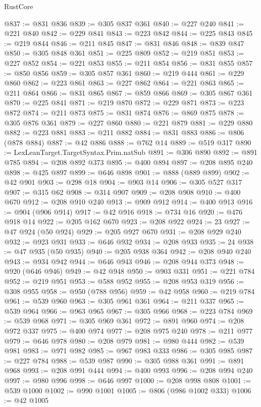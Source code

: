 \begin{lexlean}{RustCore}
\begin{coremodule}
@837 := @831 @836
@839 := @305 @837 @361
@840 := @227 @240
@841 := @221 @840
@842 := @229 @841
@843 := @223 @842
@844 := @225 @843
@845 := @219 @844
@846 := @211 @845
@847 := @831 @846
@848 := @839 @847
@850 := @305 @848 @361
@851 := @225 @809
@852 := @219 @851
@853 := @227 @852
@854 := @221 @853
@855 := @211 @854
@856 := @831 @855
@857 := @850 @856
@859 := @305 @857 @361
@860 := @219 @444
@861 := @229 @860
@862 := @223 @861
@863 := @227 @862
@864 := @221 @863
@865 := @211 @864
@866 := @831 @865
@867 := @859 @866
@869 := @305 @867 @361
@870 := @225 @841
@871 := @219 @870
@872 := @229 @871
@873 := @223 @872
@874 := @211 @873
@875 := @831 @874
@876 := @869 @875
@878 := @305 @876 @361
@879 := @227 @860
@880 := @221 @879
@881 := @229 @880
@882 := @223 @881
@883 := @211 @882
@884 := @831 @883
@886 := @806 (@878 @884)
@887 := @42 @886
@888 := @762 @14
@889 := @519 @317
@890 := LexLeanTarget.TargetSyntax.Prim.natSub
@891 := @306 @890
@892 := @891 @785
@894 := @208 @892 @373
@895 := @400 @894
@897 := @208 @895 @240
@898 := @425 @897
@899 := @646 @898
@901 := @888 (@889 @899)
@902 := @42 @901
@903 := @298 @18
@904 := @903 @14
@906 := @305 @527 @317
@907 := @315 @62
@908 := @314 @907
@909 := @208 @908
@910 := @400 @670
@912 := @208 @910 @240
@913 := @909 @912
@914 := @400 @913
@916 := @904 (@906 @914)
@917 := @42 @916
@918 := @734 @16
@920 := @476 @918 @14
@922 := @205 @162 @670
@923 := @208 @922
@924 := 23
@927 := @47 @924 (@50 @924)
@929 := @205 @927 @670
@931 := @208 @929 @240
@932 := @923 @931
@933 := @646 @932
@934 := @208 @933
@935 := 24
@938 := @47 @935 (@50 @935)
@940 := @205 @938 @364
@942 := @208 @940 @240
@943 := @934 @942
@944 := @646 @943
@946 := @208 @944 @373
@948 := @920 (@646 @946)
@949 := @42 @948
@950 := @903 @331
@951 := @221 @784
@952 := @219 @951
@953 := @588 @952
@955 := @208 @953 @319
@956 := @308 @955
@958 := @950 (@788 @956)
@959 := @42 @958
@960 := @219 @784
@961 := @539 @960
@963 := @305 @961 @361
@964 := @211 @337
@965 := @539 @964
@966 := @963 @965
@967 := @305 @966
@968 := @223 @784
@969 := @539 @968
@971 := @305 @969 @361
@972 := @891 @960
@974 := @208 @972 @337
@975 := @400 @974
@977 := @208 @975 @240
@978 := @211 @977
@979 := @646 @978
@980 := @208 @979
@981 := @980 @444
@982 := @539 @981
@983 := @971 @982
@985 := @967 @983 @333
@986 := @305 @985
@987 := @227 @784
@988 := @539 @987
@990 := @305 @988 @361
@991 := @891 @968
@993 := @208 @991 @444
@994 := @400 @993
@996 := @208 @994 @240
@997 := @980 @996
@998 := @646 @997
@1000 := @208 @998 @808
@1001 := @539 @1000
@1002 := @990 @1001
@1005 := @806 (@986 @1002 @333)
@1006 := @42 @1005

\end{coremodule}
\end{lexlean}
